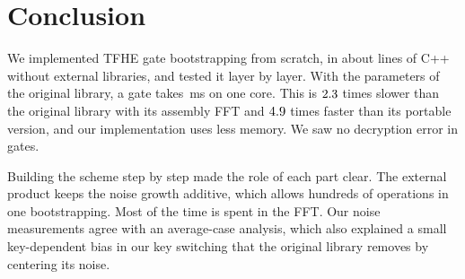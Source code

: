 \documentclass[12pt]{article}
\theoremstyle{plain}
\theoremstyle{definition}
\begin{document}


\section{Conclusion}
\label{sec:conclusion}

We implemented TFHE gate bootstrapping from scratch, in about \LibLines{} lines
of C++ without external libraries, and tested it layer by layer. With the
parameters of the original library, a gate takes \OurNandMean\,ms on one core.
This is $2.3$ times slower than the original library with its
assembly FFT and $4.9$ times faster than its portable version, and our
implementation uses less memory. We saw no decryption error in \TotalGates{}
gates.

Building the scheme step by step made the role of each part clear. The
external product keeps the noise growth additive, which allows hundreds of
operations in one bootstrapping. Most of the time is spent in the FFT. Our noise measurements agree with an average-case analysis,
which also explained a small key-dependent bias in our key switching that the
original library removes by centering its noise.



\end{document}
